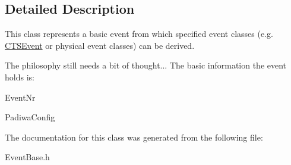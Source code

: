\subsection{Detailed Description}
This class represents a basic event from which specified event classes (e.\+g. \hyperlink{classCTSEvent}{C\+T\+S\+Event} or physical event classes) can be derived.

The philosophy still needs a bit of thought... The basic information the event holds is\+:
\begin{DoxyItemize}
\item Event\+Nr
\item Padiwa\+Config 
\end{DoxyItemize}

The documentation for this class was generated from the following file\+:\begin{DoxyCompactItemize}
\item 
Event\+Base.\+h\end{DoxyCompactItemize}
